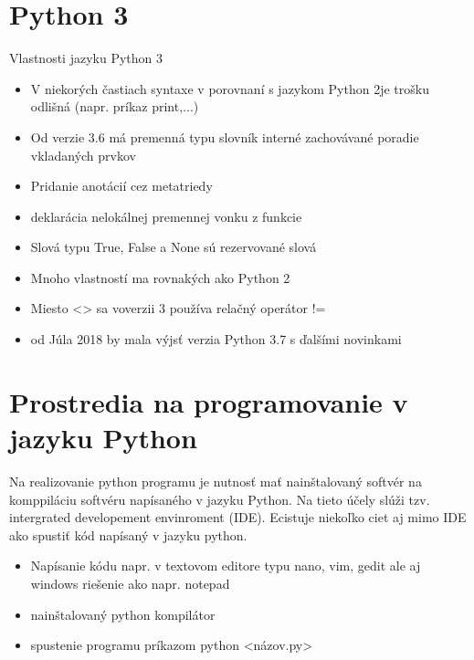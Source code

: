 \section{Python 3}
Vlastnosti jazyku Python 3\cite{Python3}\begin{itemize}
\item V niekorých častiach syntaxe v porovnaní s jazykom Python 2je trošku odlišná (napr. príkaz print,...)
\item Od verzie 3.6 má premenná typu slovník interné zachovávané poradie vkladaných prvkov
\item Pridanie anotácií cez metatriedy
\item deklarácia nelokálnej premennej vonku z funkcie
\item Slová typu True, False a None sú rezervované slová
\item Mnoho vlastností ma rovnakých ako Python 2
\item Miesto <> sa voverzii 3 používa relačný operátor !=
\item od Júla 2018 by mala výjsť verzia Python 3.7 s ďalšími novinkami 
\end{itemize}
\section{Prostredia na programovanie v jazyku Python}
Na realizovanie python programu je nutnosť mať nainštalovaný softvér na komppiláciu softvéru napísaného v jazyku Python. Na tieto účely slúži tzv. intergrated developement envinroment (IDE). Ecistuje niekoľko ciet aj mimo IDE ako spustiť kód napísaný v jazyku python.\begin{itemize}
\item Napísanie kódu napr. v textovom editore typu nano, vim, gedit ale aj windows riešenie ako napr. notepad
\item nainštalovaný python kompilátor
\item spustenie programu príkazom python <názov.py>
\end{itemize}
